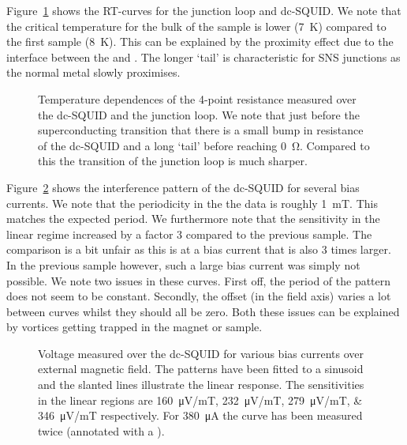 Figure~\ref{fig:CP2.6B_RT_curves} shows the RT-curves for the junction loop and dc-SQUID. We note that the critical temperature for the bulk of the sample is lower (\qty{7}{\kelvin}) compared to the first sample (\qty{8}{\kelvin}). This can be explained by the proximity effect due to the interface between the  and \cite{cirilloSuperconductingProximityEffect2005}. The longer `tail' is characteristic for SNS junctions as the normal metal slowly proximises.

\begin{figure}[ht!]
	\centering
	
	\caption{Temperature dependences of the 4-point resistance measured over the dc-SQUID and the junction loop. We note that just before the superconducting transition that there is a small bump in resistance of the dc-SQUID and a long `tail' before reaching \qty{0}{\ohm}. Compared to this the transition of the junction loop is much sharper.}
	\label{fig:CP2.6B_RT_curves}
\end{figure}

Figure~\ref{fig:CP2.6B_SQUID_calibration_curves} shows the interference pattern of the dc-SQUID for several bias currents. We note that the periodicity in the the data is roughly \qty{1}{\milli\tesla}. This matches the expected period. We furthermore note that the sensitivity in the linear regime increased by a factor 3 compared to the previous sample. The comparison is a bit unfair as this is at a bias current that is also 3 times larger. In the previous sample however, such a large bias current was simply not possible. We note two issues in these curves. First off, the period of the pattern does not seem to be constant. Secondly, the offset (in the field axis) varies a lot between curves whilst they should all be zero. Both these issues can be explained by vortices getting trapped in the magnet or sample. 

\begin{figure}[ht!]
	\centering
	
	\caption{Voltage measured over the dc-SQUID for various bias currents over external magnetic field. The patterns have been fitted to a sinusoid and the slanted lines illustrate the linear response. The sensitivities in the linear regions are \qtylist{160;232;279;346}{\micro\volt/\milli\tesla} respectively. For \qty{380}{\micro\ampere} the curve has been measured twice (annotated with a \dag).}
	\label{fig:CP2.6B_SQUID_calibration_curves}
\end{figure}

